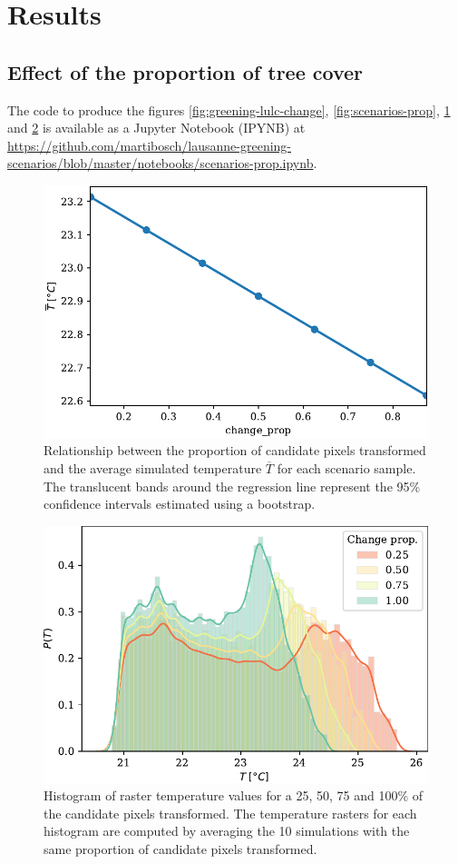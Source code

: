 \documentclass[10pt,letterpaper]{article}
\begin{document}
\section*{Results}

\subsection*{Effect of the proportion of tree cover}
\label{sec:effect-prop}

The code to produce the figures \ref{fig:greening-lulc-change}, \ref{fig:scenarios-prop}, \ref{fig:scenarios-prop-regplot} and \ref{fig:scenarios-prop-hists} is available as a Jupyter Notebook (IPYNB) at \url{https://github.com/martibosch/lausanne-greening-scenarios/blob/master/notebooks/scenarios-prop.ipynb}.

\begin{figure}[ht]
  \centering
  \includegraphics[width=.6\textwidth]{figures/scenarios-prop-regplot}
  \caption{\label{fig:scenarios-prop-regplot} Relationship between the proportion of candidate pixels transformed and the average simulated temperature $\overline{T}$ for each scenario sample. The translucent bands around the regression line represent the 95\% confidence intervals estimated using a bootstrap.}
\end{figure}


\begin{figure}[ht]
  \centering
  \includegraphics[width=.6\textwidth]{figures/scenarios-prop-hists}
  \caption{\label{fig:scenarios-prop-hists} Histogram of raster temperature values for a 25, 50, 75 and 100\% of the candidate pixels transformed. The temperature rasters for each histogram are computed by averaging the 10 simulations with the same proportion of candidate pixels transformed.}
\end{figure}
\end{document}
